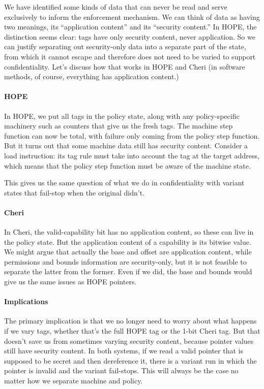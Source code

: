 \documentclass{article}
\begin{document}
We have identified some kinds of data that can never be read and serve exclusively to inform
the enforcement mechanism. We can think of data as having two meanings, its ``application
content'' and its ``security content.'' In HOPE, the distinction seems clear: tags have only
security content, never application. So we can justify separating out security-only data
into a separate part of the state, from which it cannot escape and therefore does not need
to be varied to support confidentiality. Let's discuss how that works in HOPE and Cheri
(in software methods, of course, everything has application content.)

\paragraph*{HOPE} In HOPE, we put all tags in the policy state, along with any policy-specific
machinery such as counters that give us the fresh tags. The machine step function can now be
total, with failure only coming from the policy step function. But it turns out that some
machine data still has security content. Consider a load instruction: its tag rule must
take into account the tag at the target address, which means that the policy step function
must be aware of the machine state.

This gives us the same question of what we do in confidentiality with variant states that
fail-stop when the original didn't.

\paragraph*{Cheri} In Cheri, the valid-capability bit has no application content, so these can
live in the policy state. But the application content of a capability is its bitwise value.
We might argue that actually the base and offset are application content, while permissions
and bounds information are security-only, but it is not feasible to separate the latter
from the former. Even if we did, the base and bounds would give us the same issues as HOPE
pointers.

\paragraph*{Implications} The primary implication is that we no longer need to worry about
what happens if we vary tags, whether that's the full HOPE tag or the 1-bit Cheri tag.
But that doesn't save us from sometimes varying security content, because pointer values
still have security content. In both systems, if we read a valid pointer that is supposed to
be secret and then dereference it, there is a variant run in which the pointer is invalid and
the variant fail-stops. This will always be the case no matter how we separate machine and
policy.
\end{document}

